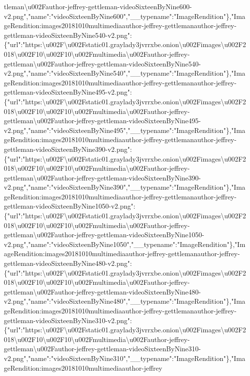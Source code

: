 tleman\textbackslash{}u002Fauthor-jeffrey-gettleman-videoSixteenByNine600-v2.png","name":"videoSixteenByNine600","\_\_typename":"ImageRendition"\},"ImageRendition:images20181010multimediaauthor-jeffrey-gettlemanauthor-jeffrey-gettleman-videoSixteenByNine540-v2.png":\{"url":"https:\textbackslash{}u002F\textbackslash{}u002Fstatic01.graylady3jvrrxbe.onion\textbackslash{}u002Fimages\textbackslash{}u002F2018\textbackslash{}u002F10\textbackslash{}u002F10\textbackslash{}u002Fmultimedia\textbackslash{}u002Fauthor-jeffrey-gettleman\textbackslash{}u002Fauthor-jeffrey-gettleman-videoSixteenByNine540-v2.png","name":"videoSixteenByNine540","\_\_typename":"ImageRendition"\},"ImageRendition:images20181010multimediaauthor-jeffrey-gettlemanauthor-jeffrey-gettleman-videoSixteenByNine495-v2.png":\{"url":"https:\textbackslash{}u002F\textbackslash{}u002Fstatic01.graylady3jvrrxbe.onion\textbackslash{}u002Fimages\textbackslash{}u002F2018\textbackslash{}u002F10\textbackslash{}u002F10\textbackslash{}u002Fmultimedia\textbackslash{}u002Fauthor-jeffrey-gettleman\textbackslash{}u002Fauthor-jeffrey-gettleman-videoSixteenByNine495-v2.png","name":"videoSixteenByNine495","\_\_typename":"ImageRendition"\},"ImageRendition:images20181010multimediaauthor-jeffrey-gettlemanauthor-jeffrey-gettleman-videoSixteenByNine390-v2.png":\{"url":"https:\textbackslash{}u002F\textbackslash{}u002Fstatic01.graylady3jvrrxbe.onion\textbackslash{}u002Fimages\textbackslash{}u002F2018\textbackslash{}u002F10\textbackslash{}u002F10\textbackslash{}u002Fmultimedia\textbackslash{}u002Fauthor-jeffrey-gettleman\textbackslash{}u002Fauthor-jeffrey-gettleman-videoSixteenByNine390-v2.png","name":"videoSixteenByNine390","\_\_typename":"ImageRendition"\},"ImageRendition:images20181010multimediaauthor-jeffrey-gettlemanauthor-jeffrey-gettleman-videoSixteenByNine1050-v2.png":\{"url":"https:\textbackslash{}u002F\textbackslash{}u002Fstatic01.graylady3jvrrxbe.onion\textbackslash{}u002Fimages\textbackslash{}u002F2018\textbackslash{}u002F10\textbackslash{}u002F10\textbackslash{}u002Fmultimedia\textbackslash{}u002Fauthor-jeffrey-gettleman\textbackslash{}u002Fauthor-jeffrey-gettleman-videoSixteenByNine1050-v2.png","name":"videoSixteenByNine1050","\_\_typename":"ImageRendition"\},"ImageRendition:images20181010multimediaauthor-jeffrey-gettlemanauthor-jeffrey-gettleman-videoSixteenByNine480-v2.png":\{"url":"https:\textbackslash{}u002F\textbackslash{}u002Fstatic01.graylady3jvrrxbe.onion\textbackslash{}u002Fimages\textbackslash{}u002F2018\textbackslash{}u002F10\textbackslash{}u002F10\textbackslash{}u002Fmultimedia\textbackslash{}u002Fauthor-jeffrey-gettleman\textbackslash{}u002Fauthor-jeffrey-gettleman-videoSixteenByNine480-v2.png","name":"videoSixteenByNine480","\_\_typename":"ImageRendition"\},"ImageRendition:images20181010multimediaauthor-jeffrey-gettlemanauthor-jeffrey-gettleman-videoSixteenByNine310-v2.png":\{"url":"https:\textbackslash{}u002F\textbackslash{}u002Fstatic01.graylady3jvrrxbe.onion\textbackslash{}u002Fimages\textbackslash{}u002F2018\textbackslash{}u002F10\textbackslash{}u002F10\textbackslash{}u002Fmultimedia\textbackslash{}u002Fauthor-jeffrey-gettleman\textbackslash{}u002Fauthor-jeffrey-gettleman-videoSixteenByNine310-v2.png","name":"videoSixteenByNine310","\_\_typename":"ImageRendition"\},"ImageRendition:images20181010multimediaauthor-jeffrey